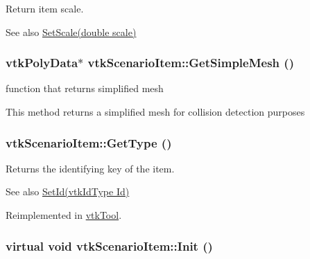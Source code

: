 Return item scale. 

\begin{DoxySeeAlso}{See also}
\hyperlink{classvtkScenarioItem_a4d199d1138fbfe835c36cd20efbedb1e}{SetScale(double scale)} 
\end{DoxySeeAlso}
\hypertarget{classvtkScenarioItem_a1c8a6fcb05ff01e2fda8034078f46236}{
\subsubsection[{GetSimpleMesh}]{\setlength{\rightskip}{0pt plus 5cm}vtkPolyData$\ast$ vtkScenarioItem::GetSimpleMesh ()}}
\label{classvtkScenarioItem_a1c8a6fcb05ff01e2fda8034078f46236}


function that returns simplified mesh 

This method returns a simplified mesh for collision detection purposes \hypertarget{classvtkScenarioItem_ae0fec908b834864a99e2907e57c71081}{
\subsubsection[{GetType}]{ vtkScenarioItem::GetType ()}}
\label{classvtkScenarioItem_ae0fec908b834864a99e2907e57c71081}


Returns the identifying key of the item. 

\begin{DoxySeeAlso}{See also}
\hyperlink{classvtkScenarioItem_afd99a6db7187837d0129e9898478ec60}{SetId(vtkIdType Id)} 
\end{DoxySeeAlso}


Reimplemented in \hyperlink{classvtkTool_ab09b1fa6f511ca80859b3e59cedd62de}{vtkTool}.

\hypertarget{classvtkScenarioItem_a87f01894de62f23433aa2eb3f995c216}{
\subsubsection[{Init}]{\setlength{\rightskip}{0pt plus 5cm}virtual void vtkScenarioItem::Init ()}}
\label{classvtkScenarioItem_a87f01894de62f23433aa2eb3f995c216}


